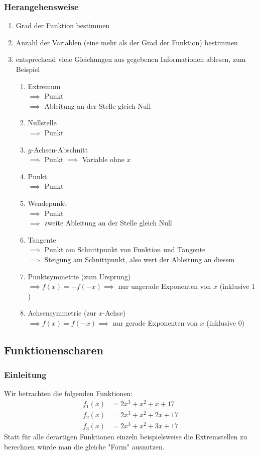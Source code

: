 \documentclass{article}
\begin{document}
  \subsubsection{Herangehensweise}
  \begin{enumerate}
  	\item Grad der Funktion bestimmen
  	\item Anzahl der Variablen (eine mehr als der Grad der Funktion) bestimmen
  	\item entsprechend viele Gleichungen aus gegebenen Informationen ablesen, zum Beispiel
  	\begin{enumerate}
  		\item Extremum \\
  		$\implies$ Punkt \\
  		$\implies$ Ableitung an der Stelle gleich Null
  		\item Nullstelle \\
  		$\implies$ Punkt
  		\item $y$-Achsen-Abschnitt \\
  		$\implies$ Punkt $\implies$ Variable ohne $x$
  		\item Punkt \\
  		$\implies$ Punkt
  		\item Wendepunkt \\
  		$\implies$ Punkt \\
  		$\implies$ zweite Ableitung an der Stelle gleich Null
  		\item Tangente \\
  		$\implies$ Punkt am Schnittpunkt von Funktion und Tangente \\
  		$\implies$ Steigung am Schnittpunkt, also wert der Ableitung an diesem 
  		\item Punktsymmetrie (zum Ursprung) \\
  		$\implies f(x) = -f(-x) \implies$ nur ungerade Exponenten von $x$ (inklusive $1$)
  		\item Achsensymmetrie (zur $x$-Achse) \\
  		$\implies f(x) = f(-x) \implies$ nur gerade Exponenten von $x$ (inklusive $0$)
  	\end{enumerate}
  \end{enumerate}
  
  \subsection{Funktionenscharen}
  
  \subsubsection{Einleitung}
  Wir betrachten die folgenden Funktionen: 
  \begin{align*}
  	f_1(x) &= 2x^3 + x^2 + x + 17 \\
  	f_2(x) &= 2x^3 + x^2 + 2x + 17 \\
  	f_3(x) &= 2x^3 + x^2 + 3x + 17
  \end{align*}
  Statt für alle derartigen Funktionen einzeln beispielsweise die Extremstellen zu berechnen würde man die gleiche "Form" ausnutzen. 
  
\end{document}
